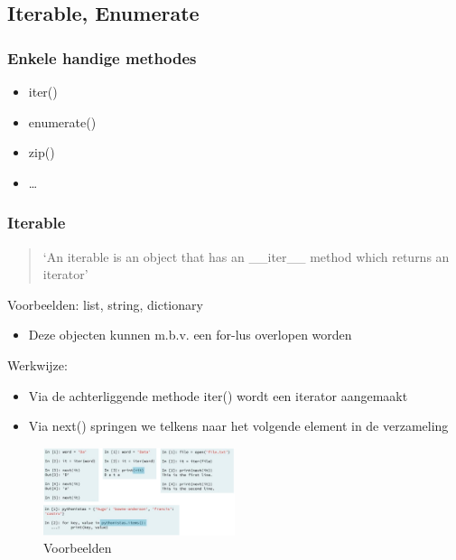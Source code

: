 \documentclass{article}
\begin{document}
\subsection{Iterable, Enumerate}

\subsubsection{Enkele handige methodes}

\begin{itemize}
    \item iter()
    \item enumerate()
    \item zip()
    \item \dots
\end{itemize}

\subsubsection{Iterable}

\begin{quote}
    `An iterable is an object that has an \_\_iter\_\_ method which returns an iterator'
\end{quote}

Voorbeelden: list, string, dictionary

\begin{itemize}
    \item Deze objecten kunnen m.b.v. een for-lus overlopen worden
\end{itemize}

Werkwijze: 

\begin{itemize}
    \item Via de achterliggende methode iter() wordt een iterator aangemaakt
    \item Via next() springen we telkens naar het volgende element in de verzameling
\end{itemize}

\begin{figure}[H]
    \centering
    \includegraphics[width=0.5\textwidth]{iterables.png}
    \caption{Voorbeelden}
\end{figure}
\end{document}
